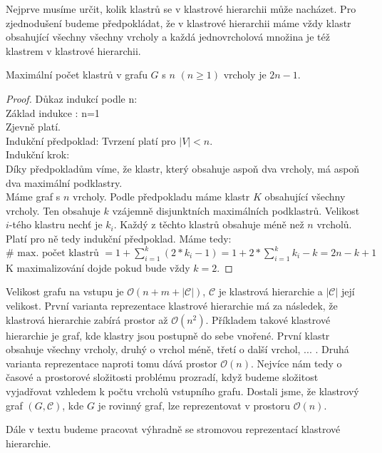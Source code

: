 Nejprve musíme určit, kolik klastrů se v klastrové hierarchii může nacházet.
Pro zjednodušení budeme předpokládat, že v klastrové hierarchii máme vždy klastr obsahující všechny všechny vrcholy a každá jednovrcholová množina je též klastrem v klastrové hierarchii.
\begin{tvr}
Maximální počet klastrů v grafu $G$ s $n$ $(n \geq 1)$ vrcholy je $2n-1$.
\end{tvr}
\begin{proof}
Důkaz indukcí podle n: \\
Základ indukce : n=1 \\
Zjevně platí. \\
Indukční předpoklad: Tvrzení platí pro $|V| < n$.\\
Indukční krok:  \\
Díky předpokladům víme, že klastr, který obsahuje aspoň dva vrcholy, má aspoň dva maximální podklastry. \\
Máme graf s $n$ vrcholy. Podle předpokladu máme klastr $K$ obsahující všechny vrcholy. Ten obsahuje $k$ vzájemně disjunktních maximálních podklastrů. Velikost $i$-tého klastru nechť je $k_i$. Každý z těchto klastrů obsahuje méně než $n$ vrcholů. Platí pro ně tedy indukční předpoklad. Máme tedy: \\
$\#  \text{ max. počet klastrů }= 1 + \sum\limits_{i=1}^k (2*k_i-1) = 1 + 2*\sum\limits_{i=1}^k k_i - k = 2n - k + 1 $\\
K maximalizování dojde pokud bude vždy $k=2$.
\end{proof}

Velikost grafu na vstupu je  $\mathcal{O}(n+m+| \mathcal C|)$, $\mathcal C$ je klastrová hierarchie a $| \mathcal C|$ její velikost. 
První varianta reprezentace klastrové hierarchie má za následek, že klastrová hierarchie zabírá prostor až $\mathcal{O}(n^2)$. Příkladem takové klastrové hierarchie je graf, kde klastry jsou postupně do sebe vnořené. První klastr obsahuje všechny vrcholy, druhý o vrchol méně, třetí o další vrchol, ... .
Druhá varianta reprezentace naproti tomu dává prostor $\mathcal{O}(n)$. Nejvíce nám tedy o časové a prostorové složitosti problému prozradí, když budeme složitost vyjadřovat vzhledem k počtu vrcholů vstupního grafu. Dostali jsme, že klastrový graf $(G,\mathcal C )$, kde $G$ je rovinný graf, lze reprezentovat v prostoru $\mathcal O (n)$.

Dále v textu budeme pracovat výhradně se stromovou reprezentací klastrové hierarchie.

